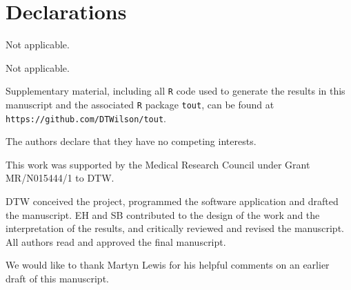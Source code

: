 \documentclass[referee, lineno, pdflatex,sn-vancouver,Numbered]{sn-jnl}%
\theoremstyle{thmstyleone}%
\theoremstyle{thmstyletwo}%
\theoremstyle{thmstylethree}%
\begin{document}
\backmatter

\section*{Declarations}


Not applicable.


Not applicable.


Supplementary material, including all \texttt{R} code used to generate the results in this manuscript and the associated \texttt{R} package \texttt{tout}, can be found at \texttt{https://github.com/DTWilson/tout}.


The authors declare that they have no competing interests.


This work was supported by the Medical Research Council under Grant MR/N015444/1 to DTW.


DTW conceived the project, programmed the software application and drafted the manuscript. EH and SB contributed to the design of the work and the interpretation of the results, and critically reviewed and revised the manuscript. All authors read and approved the final manuscript.


We would like to thank Martyn Lewis for his helpful comments on an earlier draft of this manuscript.


\end{document}
